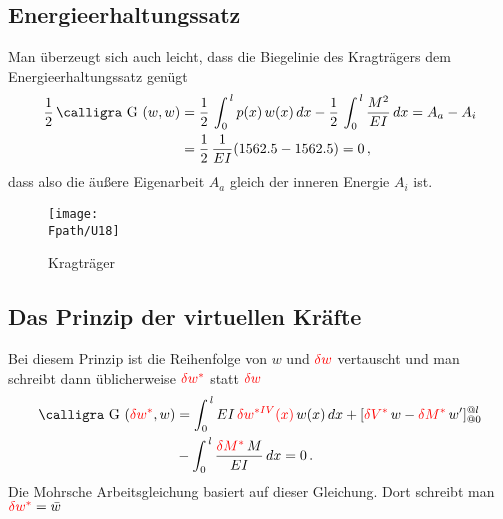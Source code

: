 {{{{%
{\textcolor{sectionTitleBlue}{\subsection{Energieerhaltungssatz}}}
Man \"{u}berzeugt sich auch leicht, dass die Biegelinie des Kragtr\"{a}gers dem Energieerhaltungssatz gen\"{u}gt
\begin{align}
\frac{1}{2}\, \text{\normalfont\calligra G\,\,}(w,w) &= \frac{1}{2}\,\int_0^{\,l} p(x)\,w(x)\,dx - \frac{1}{2}\,\int_0^{\,l} \frac{M^2}{EI}\,dx = A_a - A_i \nn \\
& = \frac{1}{2}\,\frac{1}{EI} ( 1562.5 - 1562.5) = 0\,,
\end{align}
dass also die \"{a}u{\ss}ere Eigenarbeit $A_a$  gleich der inneren Energie $A_i$ ist.
\begin{figure}[tbp]
\centering
\if {} \sidecaption \fi
\texttt{[image: \\Fpath/U18]}
\caption{Kragtr\"{a}ger} \label{U18}
\end{figure}%

{\textcolor{sectionTitleBlue}{\subsection{Das Prinzip der virtuellen Kr\"{a}fte}}}
Bei diesem Prinzip ist die Reihenfolge von $w$ und $\textcolor{red}{\delta w}$ vertauscht und man schreibt dann \"{u}blicherweise $\textcolor{red}{\delta w^*}$ statt $\textcolor{red}{\delta w} $
\begin{align} \label{Eq29}
\text{\normalfont\calligra G\,\,}(\textcolor{red}{\delta w^*},w) &= \int_0^{\,l} EI\,\textcolor{red}{\delta w^{*IV}(x)}\,w(x)\,dx + [\textcolor{red}{\delta V^*}\, w - \textcolor{red}{\delta M^*}\,w']_{@0}^{@l} \nn \\
&- \int_0^{\,l} \frac{\textcolor{red}{\delta M^*}\,M}{EI}\,dx = 0\,.
\end{align}
Die { Mohrsche Arbeitsgleichung} basiert auf dieser Gleichung. Dort schreibt man $\textcolor{red}{\delta w^*} = \bar{w}$

}}}}
